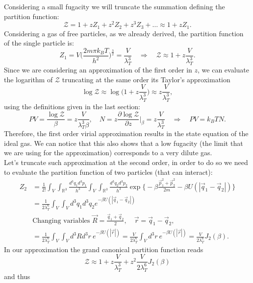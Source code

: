 Considering a small fugacity we will truncate the summation defining the partition function:
\begin{equation*}
    \mathcal{Z} =1+zZ_1+z^2Z_2+z^3Z_3+\dots\approx1+zZ_1.
\end{equation*}
Considering a gas of free particles, as we already derived, the partition function of the single particle is:
\begin{equation*}
    Z_1=V\bigg(\frac{2m\pi k_BT}{h^2}\bigg)^{\frac{3}{2}}=\frac{V}{\lambda^3_T}\quad \Rightarrow\quad \mathcal{Z} \approx1+z\frac{V}{\lambda_T^3}.
\end{equation*}
Since we are considering an approximation of the first order in $z$, we can evaluate the logarithm of $\mathcal{Z} $ truncating at the same order its Taylor's approximation
\begin{equation*}
    \log\mathcal{Z} \approx\log\bigg(1+z\frac{V}{\lambda_T^3}\bigg)\approx z\frac{V}{\lambda_T^3},
\end{equation*}
using the definitions given in the last section:
\begin{equation*}
    PV=\frac{\log\mathcal{Z} }{\beta}=z\frac{V}{\lambda_T^3\beta},\quad N=z\frac{\partial\log\mathcal{Z} }{\partial z}\bigg|_{\beta}=z\frac{V}{\lambda_T^3}\quad\Rightarrow\quad PV=k_BTN.
\end{equation*}
Therefore, the first order virial approximation results in the state equation of the ideal gas. We can notice that this also shows that a low fugacity (the limit that we are using for the approximation) corresponds to a very dilute gas.\\

Let's truncate such approximation at the second order, in order to do so we need to evaluate the partition function of two particles (that can interact):
\begin{align*}
    Z_2&=\frac{1}{2!}\int_{V}\int_{\mathbb{R} ^3}\frac{d^3q_1d^3p_1}{h^3}\int_{V}\int_{\mathbb{R} ^3}\frac{d^3q_2d^3p_2}{h^3}\exp\bigg\{-\beta\frac{\vec p^2_1+\vec p_2^2}{2m}-\beta U(|\vec q_1-\vec q_2|)\bigg\}\\&=\frac{1}{2\lambda_T^6}\int_{V}\int_Vd^3q_1d^3q_2e^{-\beta U(|\vec q_1-\vec q_2|)}\\
    &\text{Changing variables } \vec R=\frac{\vec q_1+\vec q_2}{2},\quad \vec r=\vec q_1-\vec q_2,\\
    &=\frac{1}{2\lambda_T^6}\int_{V}\int_Vd^3Rd^3r\ e^{-\beta U(|\vec r|)}=\frac{V}{2\lambda_T^6}\int_{V}d^3r\ e^{-\beta U(|\vec r|)}=\frac{V}{2\lambda_T^6}J_2(\beta).
\end{align*}
In our approximation the grand canonical partition function reads
\begin{equation*}
    \mathcal{Z} \approx1+z\frac{V}{\lambda_T^3}+z^2\frac{V}{2\lambda_T^6}J_2(\beta)
\end{equation*}
and thus 


